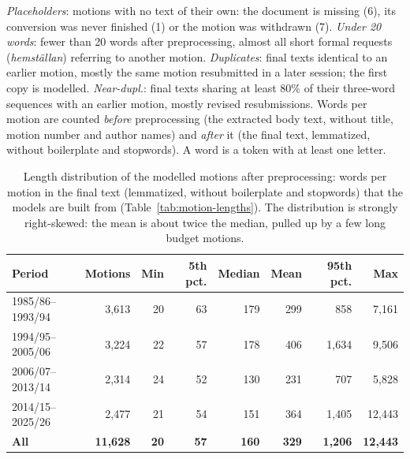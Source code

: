 \begin{landscape}
\begin{table}
{\emph{Placeholders}: motions with no text of their own: the document is missing (6), its conversion was never finished
(1) or the motion was withdrawn (7). \emph{Under 20 words}: fewer than 20 words after preprocessing, almost all short
formal requests (\emph{hemställan}) referring to another motion. \emph{Duplicates}: final texts identical to an earlier
motion, mostly the same motion resubmitted in a later session; the first copy is modelled. \emph{Near-dupl.}: final texts
sharing at least 80\% of their three-word sequences with an earlier motion, mostly revised resubmissions. Words per motion are counted
\emph{before} preprocessing (the extracted body text, without title, motion number and author names) and \emph{after}
it (the final text, lemmatized, without boilerplate and stopwords). A word is a token with at least one letter.}
\label{tab:motion-lengths}
\end{table}

\begin{table}
\centering
\renewcommand{\arraystretch}{1.3}
\begin{tabular}{|l|r|r|r|r|r|r|r|}
\hline
\textbf{Period} & \textbf{Motions} & \textbf{Min} & \textbf{5th pct.} & \textbf{Median} & \textbf{Mean}
  & \textbf{95th pct.} & \textbf{Max} \\
\hline
1985/86--1993/94 & 3,613 & 20 & 63 & 179 & 299 & 858 & 7,161 \\
1994/95--2005/06 & 3,224 & 22 & 57 & 178 & 406 & 1,634 & 9,506 \\
2006/07--2013/14 & 2,314 & 24 & 52 & 130 & 231 & 707 & 5,828 \\
2014/15--2025/26 & 2,477 & 21 & 54 & 151 & 364 & 1,405 & 12,443 \\
\hline
\textbf{All} & \textbf{11,628} & \textbf{20} & \textbf{57} & \textbf{160} & \textbf{329} & \textbf{1,206}
  & \textbf{12,443} \\
\hline
\end{tabular}
\caption{Length distribution of the modelled motions after preprocessing: words per motion in the final text
(lemmatized, without boilerplate and stopwords) that the models are built from (Table~\ref{tab:motion-lengths}). The
distribution is strongly right-skewed: the mean is about twice the median, pulled up by a few long budget motions.}
\label{tab:motion-length-distribution}
\end{table}
\end{landscape}

